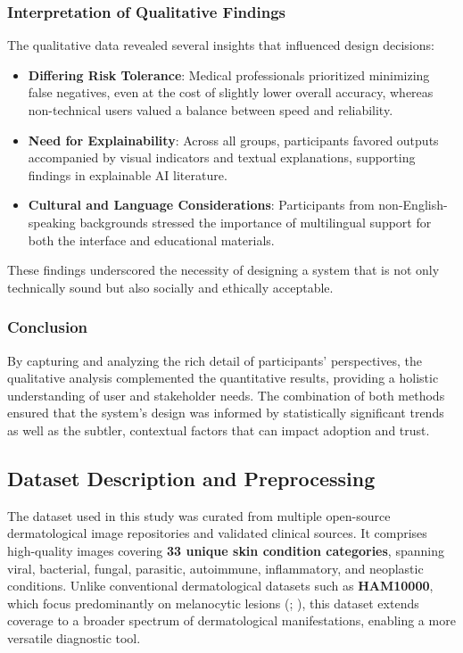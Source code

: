\documentclass[
  12pt,
  oneside]{article}
\providecommand{\tightlist}{%
  \setlength{\itemsep}{0pt}\setlength{\parskip}{0pt}}
\begin{document}
\subsubsection{Interpretation of Qualitative
Findings}\label{interpretation-of-qualitative-findings}

The qualitative data revealed several insights that influenced design
decisions:

\begin{itemize}
\tightlist
\item
  \textbf{Differing Risk Tolerance}: Medical professionals prioritized
  minimizing false negatives, even at the cost of slightly lower overall
  accuracy, whereas non-technical users valued a balance between speed
  and reliability.
\item
  \textbf{Need for Explainability}: Across all groups, participants
  favored outputs accompanied by visual indicators and textual
  explanations, supporting findings in explainable AI literature.
\item
  \textbf{Cultural and Language Considerations}: Participants from
  non-English-speaking backgrounds stressed the importance of
  multilingual support for both the interface and educational materials.
\end{itemize}

These findings underscored the necessity of designing a system that is
not only technically sound but also socially and ethically acceptable.

\subsubsection{Conclusion}\label{conclusion-1}

By capturing and analyzing the rich detail of participants'
perspectives, the qualitative analysis complemented the quantitative
results, providing a holistic understanding of user and stakeholder
needs. The combination of both methods ensured that the system's design
was informed by statistically significant trends as well as the subtler,
contextual factors that can impact adoption and trust.

\subsection{Dataset Description and
Preprocessing}\label{dataset-description-and-preprocessing}

The dataset used in this study was curated from multiple open-source
dermatological image repositories and validated clinical sources. It
comprises high-quality images covering \textbf{33 unique skin condition
categories}, spanning viral, bacterial, fungal, parasitic, autoimmune,
inflammatory, and neoplastic conditions. Unlike conventional
dermatological datasets such as \textbf{HAM10000}, which focus
predominantly on melanocytic lesions (; ), this dataset extends coverage to a broader spectrum of
dermatological manifestations, enabling a more versatile diagnostic
tool.
\end{document}
